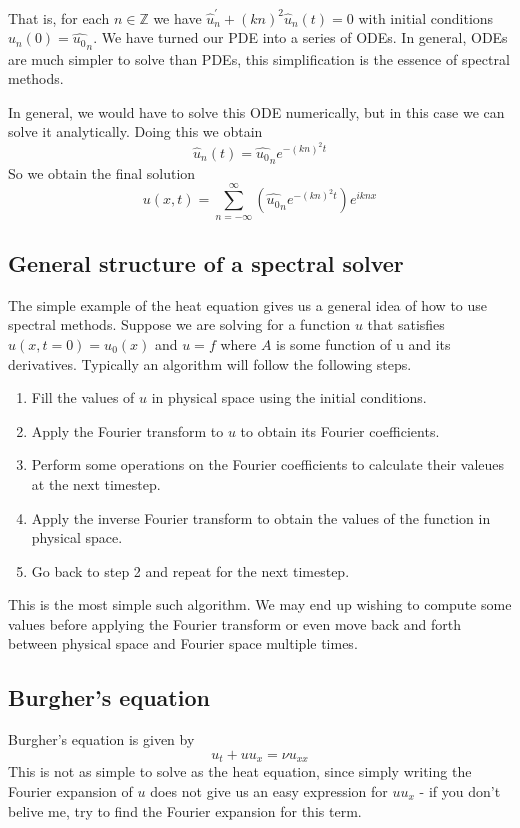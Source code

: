 \documentclass[a4paper,11pt]{article}
\theoremstyle{plain} %
\theoremstyle{remark}
\theoremstyle{definition} %
\begin{document}
That is, for each $n\in \mathbb{Z}$ we have $\widehat{u}^\prime_n +(kn)^2\widehat{u}_n(t)=0$ with initial conditions $\widehat{u}_n(0)=\widehat{u_0}_n$. We have turned our PDE into a series of ODEs. In general, ODEs are much simpler to solve than PDEs, this simplification is the essence of spectral methods.

In general, we would have to solve this ODE numerically, but in this case we can solve it analytically. Doing this we obtain
\[
\widehat{u}_n(t)=\widehat{u_0}_ne^{-(kn)^2t}
\]
So we obtain the final solution
\[
u(x,t)=\sum_{n=-\infty}^\infty \left(\widehat{u_0}_ne^{-(kn)^2t}\right)e^{iknx}
\]

\subsection{General structure of a spectral solver}
The simple example of the heat equation gives us a general idea of how to use spectral methods. Suppose we are solving for a function $u$ that satisfies $u(x,t=0)=u_0(x)$ and $u=f$ where $A$ is some function of u and its derivatives. Typically an algorithm will follow the following steps. 
\begin{enumerate}
	\item Fill the values of $u$ in physical space using the initial conditions.
	\item Apply the Fourier transform to $u$ to obtain its Fourier coefficients.
	\item Perform some operations on the Fourier coefficients to calculate their valeues at the next timestep.
	\item Apply the inverse Fourier transform to obtain the values of the function in physical space.
	\item Go back to step 2 and repeat for the next timestep. 
\end{enumerate}

This is the most simple such algorithm. We may end up wishing to compute some values before applying the Fourier transform or even move back and forth between physical space and Fourier space multiple times.

\subsection{Burgher's equation}
Burgher's equation is given by
\[
u_t+uu_x=\nu u_{xx}
\]
This is not as simple to solve as the heat equation, since simply writing the Fourier expansion of $u$ does not give us an easy expression for $uu_x$ - if you don't belive me, try to find the Fourier expansion for this term.
\end{document}
